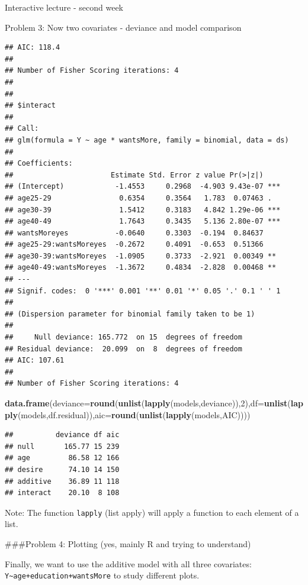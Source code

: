 \documentclass[
  ignorenonframetext,
]{beamer}
\newenvironment{Shaded}{\begin{snugshade}}{\end{snugshade}}
\newcommand{\AttributeTok}[1]{\textcolor[rgb]{0.13,0.29,0.53}{#1}}
\newcommand{\DecValTok}[1]{\textcolor[rgb]{0.00,0.00,0.81}{#1}}
\newcommand{\FunctionTok}[1]{\textcolor[rgb]{0.13,0.29,0.53}{\textbf{#1}}}
\newcommand{\NormalTok}[1]{#1}
\begin{document}
\begin{frame}[fragile]{Interactive lecture - second week}
\begin{block}{Problem 3: Now two covariates - deviance and model
comparison}
\begin{verbatim}
## AIC: 118.4
## 
## Number of Fisher Scoring iterations: 4
## 
## 
## $interact
## 
## Call:
## glm(formula = Y ~ age * wantsMore, family = binomial, data = ds)
## 
## Coefficients:
##                       Estimate Std. Error z value Pr(>|z|)    
## (Intercept)            -1.4553     0.2968  -4.903 9.43e-07 ***
## age25-29                0.6354     0.3564   1.783  0.07463 .  
## age30-39                1.5412     0.3183   4.842 1.29e-06 ***
## age40-49                1.7643     0.3435   5.136 2.80e-07 ***
## wantsMoreyes           -0.0640     0.3303  -0.194  0.84637    
## age25-29:wantsMoreyes  -0.2672     0.4091  -0.653  0.51366    
## age30-39:wantsMoreyes  -1.0905     0.3733  -2.921  0.00349 ** 
## age40-49:wantsMoreyes  -1.3672     0.4834  -2.828  0.00468 ** 
## ---
## Signif. codes:  0 '***' 0.001 '**' 0.01 '*' 0.05 '.' 0.1 ' ' 1
## 
## (Dispersion parameter for binomial family taken to be 1)
## 
##     Null deviance: 165.772  on 15  degrees of freedom
## Residual deviance:  20.099  on  8  degrees of freedom
## AIC: 107.61
## 
## Number of Fisher Scoring iterations: 4
\end{verbatim}

\begin{Shaded}
\begin{Highlighting}[]
\FunctionTok{data.frame}\NormalTok{(}\AttributeTok{deviance=}\FunctionTok{round}\NormalTok{(}\FunctionTok{unlist}\NormalTok{(}\FunctionTok{lapply}\NormalTok{(models,deviance)),}\DecValTok{2}\NormalTok{),}\AttributeTok{df=}\FunctionTok{unlist}\NormalTok{(}\FunctionTok{lapply}\NormalTok{(models,df.residual)),}\AttributeTok{aic=}\FunctionTok{round}\NormalTok{(}\FunctionTok{unlist}\NormalTok{(}\FunctionTok{lapply}\NormalTok{(models,AIC))))}
\end{Highlighting}
\end{Shaded}

\begin{verbatim}
##          deviance df aic
## null       165.77 15 239
## age         86.58 12 166
## desire      74.10 14 150
## additive    36.89 11 118
## interact    20.10  8 108
\end{verbatim}

Note: The function \texttt{lapply} (list apply) will apply a function to
each element of a list.

\#\#\#Problem 4: Plotting (yes, mainly R and trying to understand)

Finally, we want to use the additive model with all three covariates:
\texttt{Y\textasciitilde{}age+education+wantsMore} to study different
plots.


\end{block}
\end{frame}
\end{document}
